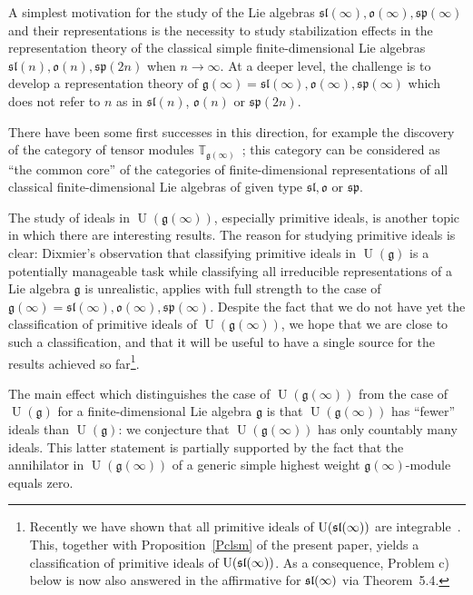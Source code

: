 \documentclass{emsprocart}
\begin{document}
A simplest motivation for the study of the Lie algebras $\mathfrak{sl}(\infty), \mathfrak o(\infty), \mathfrak{sp}(\infty)$ and their representations is the necessity to study stabilization effects in the representation theory of the classical simple finite-dimensional Lie algebras $\mathfrak{sl}(n), \mathfrak o(n), \mathfrak{sp}(2n)$ when $n\to\infty$. At a deeper level, the challenge is to develop a representation theory of $\mathfrak g(\infty)=\mathfrak{sl}(\infty), \mathfrak o(\infty), \mathfrak{sp}(\infty)$ which %
does not refer to $n$ as in $\mathfrak{sl}(n)$, $\mathfrak o(n)$ or $\mathfrak{sp}(2n)$.

There have been some first successes in this direction, for example the discovery of the category of tensor modules $\mathbb T_{\mathfrak g(\infty)}$~\cite{DPS}; this category can be considered as ``the common core'' of the categories of finite-dimensional representations of all classical finite-dimensional Lie algebras of given type $\mathfrak{sl}, \mathfrak o$ or $\mathfrak{sp}$.

The study of ideals in $\operatorname{U}(\mathfrak g(\infty))$, especially primitive ideals, is another topic in which there are interesting results. The reason for studying primitive ideals is clear: Dixmier's observation that classifying primitive ideals in $\operatorname{U}(\mathfrak g)$ is a potentially manageable task while classifying all irreducible representations of a Lie algebra $\mathfrak g$ is unrealistic, applies with full strength to the case of $\mathfrak g(\infty)=\mathfrak{sl}(\infty), \mathfrak o(\infty), \mathfrak{sp}(\infty)$. Despite the fact that we do not have yet the classification of primitive ideals of $\operatorname{U}(\mathfrak g(\infty))$, we hope that we are close to such a classification, and that it will be useful to have a single source for the results achieved so far\footnote{Recently we have shown that all primitive ideals of $\operatorname{U}(\frak{sl}(\infty))$ are integrable~\cite{PP3}. This, together with Proposition~\ref{Pclsm} of the present paper, yields a classification of primitive ideals of $\operatorname{U}(\frak{sl}(\infty))$. As a consequence, Problem c) below is now also answered in the affirmative for $\frak{sl}(\infty)$ via Theorem~5.4.}.

The main effect which distinguishes the case of $\operatorname{U}(\mathfrak g(\infty))$ from the case of $\operatorname{U}(\mathfrak g)$ for a finite-dimensional Lie algebra $\mathfrak g$ is that $\operatorname{U}(\mathfrak g(\infty))$ has ``fewer'' ideals than $\operatorname{U}(\mathfrak g)$: we conjecture that $\operatorname{U}(\mathfrak g(\infty))$ has only countably many ideals. This latter statement is partially supported by the fact that the annihilator in $\operatorname{U}(\mathfrak g(\infty))$ of a generic simple highest weight $\mathfrak{g}(\infty)$-module equals zero.
\end{document}
